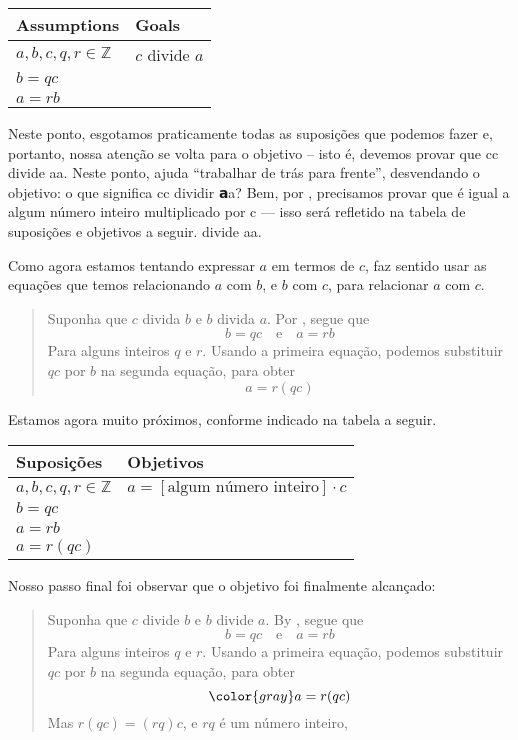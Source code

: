 \begin{example}
\begin{center}
\begin{tabular}{C{150pt}|C{150pt}}
\textbf{Assumptions} & \textbf{Goals} \\ \hline
$a,b,c,q,r \in \mathbb{Z}$ & $c$ divide $a$ \\
$b=qc$ & \\
$a=rb$ &
\end{tabular}
\end{center}

Neste ponto, esgotamos praticamente todas as suposições que podemos fazer e, portanto, nossa atenção se volta para o objetivo – isto é, devemos provar que cc
  divide aa. Neste ponto, ajuda “trabalhar de trás para frente”, desvendando o objetivo: o que significa cc dividir  𝗮a? Bem, por , precisamos provar que  é igual a algum número inteiro multiplicado por  c --- isso será refletido na tabela de suposições e objetivos a seguir.
  divide aa. 

Como agora estamos tentando expressar $a$ em termos de $c$, faz sentido usar as equações que temos relacionando $a$ com $b$, e $b$ com $c$, para relacionar $a$ com $c$.

\begin{quote}
{\color{gray} Suponha que $c$ divida $b$ e $b$ divida $a$. Por , segue que
\[
b=qc \quad \text{e} \quad a=rb
\]
Para alguns inteiros $q$ e $r$.} Usando a primeira equação, podemos substituir $qc$ por $b$ na segunda equação, para obter
\[
a=r(qc)
\]
\end{quote}

Estamos agora muito próximos, conforme indicado na tabela a seguir.

\begin{center}
\begin{tabular}{C{150pt}|C{150pt}}
\textbf{Suposições} & \textbf{Objetivos} \\ \hline
$a,b,c,q,r \in \mathbb{Z}$ & $a = [\text{algum número inteiro}] \cdot c$ \\
$b=qc$ & \\
$a=rb$ & \\
$a=r(qc)$ & 
\end{tabular}
\end{center}

Nosso passo final foi observar que o objetivo foi finalmente alcançado:

\begin{quote}
{\color{gray} Suponha que $c$ divide $b$ e $b$ divide $a$. By , segue que
\[
b=qc \quad \text{e} \quad a=rb
\]
Para alguns inteiros $q$ e $r$. Usando a primeira equação, podemos substituir $qc$ por $b$ na segunda equação, para obter}
\[
{\color{gray} a=r(qc)}
\]
Mas $r(qc) = (rq)c$, e $rq$  é um número inteiro,
\end{quote}


\end{example}
